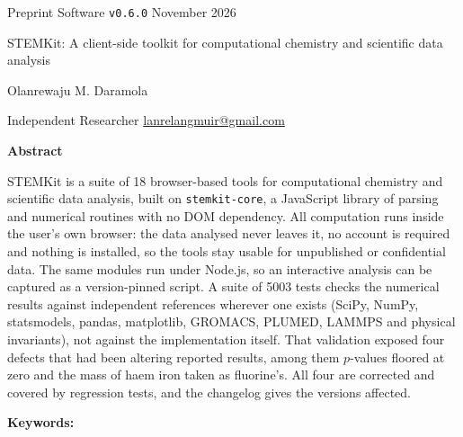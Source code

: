 \documentclass[11pt,a4paper]{article}
\begin{document}
\renewcommand{\labelenumii}{\arabic{enumi}.\arabic{enumii}}
\thispagestyle{plain}

\begin{flushleft}
{\sffamily\small\color{stkslate500}Preprint \enspace\textbar\enspace
  Software \texttt{v0.6.0} \enspace\textbar\enspace November 2026\par}
\vspace{0.9em}
{\sffamily\bfseries\LARGE\color{stkslate900}\raggedright STEMKit: A client-side
toolkit for computational chemistry and scientific data analysis\par}
\vspace{1.1em}
{\large Olanrewaju M. Daramola\,\par}
\vspace{0.3em}
{\small\color{stkslate700}Independent Researcher \enspace\textbar\enspace
  \href{mailto:lanrelangmuir@gmail.com}{lanrelangmuir@gmail.com}\par}
\end{flushleft}
\vspace{0.6em}

\begin{tcolorbox}[colback=stkblue50, colframe=stkblue, boxrule=0pt,
  leftrule=2.5pt, arc=0pt, left=12pt, right=12pt, top=9pt, bottom=9pt]
{\sffamily\bfseries\color{stkblue}Abstract}\par\smallskip
\setlength{\parindent}{0pt}
STEMKit is a suite of 18 browser-based tools for computational chemistry and
scientific data analysis, built on \texttt{stemkit-core}, a JavaScript library
of parsing and numerical routines with no DOM dependency. All computation runs
inside the user's own browser: the data analysed never leaves it, no account is
required and nothing is installed, so the tools stay usable for unpublished or
confidential data. The same modules run under Node.js, so an interactive
analysis can be captured as a version-pinned script. A suite of 5003 tests
checks the numerical results against independent references wherever one
exists (SciPy, NumPy, statsmodels, pandas, matplotlib, GROMACS, PLUMED, LAMMPS
and physical invariants), not against the implementation itself. That
validation exposed four defects that had been altering reported results, among
them $p$-values floored at zero and the mass of haem iron taken as fluorine's.
All four are corrected and covered by regression tests, and the changelog gives the versions affected.

\smallskip
{\raggedright{\sffamily\small\bfseries\color{stkslate700}Keywords:}\par}
\end{tcolorbox}
\end{document}

